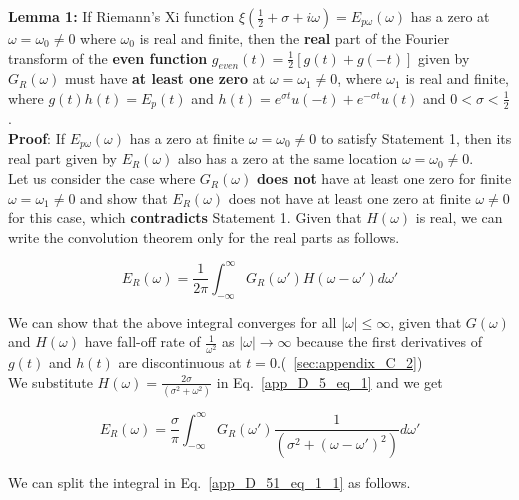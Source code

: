 \documentclass[11pt]{elsarticle}
\begin{document}
\textbf{Lemma 1:} If Riemann's Xi function $\xi(\frac{1}{2} + \sigma + i \omega)= E_{p\omega}(\omega)$ has a zero at $\omega = \omega_{0} \neq 0$ where $\omega_{0}$ is real and finite, then the \textbf{real} part of the Fourier transform of the \textbf{even function} $g_{even}(t)=\frac{1}{2} [g(t)+g(-t) ] $  given by $G_{R}(\omega)$  must have \textbf{at least one zero} at $\omega = \omega_{1} \neq 0$, where $\omega_{1}$ is real and finite, where $g(t) h(t) = E_p(t)$ and $h(t)= e^{ \sigma t} u(-t) + e^{ - \sigma t} u(t) $ and $0 < \sigma < \frac{1}{2}$.\\

\textbf{Proof}: If $E_{p\omega}(\omega)$ has a zero at finite $\omega = \omega_{0} \neq 0$ to satisfy Statement 1, then its real part given by $E_{R}(\omega)$ also has a zero at the same location $\omega = \omega_{0} \neq 0$.\\

Let us consider the case where $G_{R}(\omega)$ \textbf{does not} have at least one zero for finite $\omega = \omega_{1}  \neq 0$ and show that $E_{R}(\omega)$ does not have at least one zero at finite $\omega \neq 0$ for this case, which \textbf{contradicts} Statement 1.  Given that $H(\omega)$ is real, we can write the convolution theorem only for the real parts as follows.
 
\begin{equation} \label{app_D_5_eq_1}   
E_{R}(\omega) = \frac{1}{2 \pi}  \int_{-\infty}^{\infty} G_R(\omega') H(\omega - \omega') d\omega' 
\end{equation}

We can show that the above integral converges for all $|\omega| \leq \infty$, given that  $G(\omega)$ and $H(\omega)$ have fall-off rate of $\frac{1}{\omega^2}$ as $|\omega| \to \infty$ because the first derivatives of $g(t)$ and $h(t)$ are discontinuous at $t=0$.(~\ref{sec:appendix_C_2})\\




We substitute $H(\omega) = \frac{2 \sigma}{(\sigma^{2} + \omega^{2})}$ in Eq.~\ref{app_D_5_eq_1}  and we get

\begin{equation} \label{app_D_51_eq_1_1}   
E_{R}(\omega) = \frac{\sigma}{\pi}  \int_{-\infty}^{\infty} G_R(\omega') \frac{1}{(\sigma^{2} + (\omega - \omega')^{2})}  d\omega'
\end{equation}

We can split the integral in Eq.~\ref{app_D_51_eq_1_1} as follows.
\end{document}
